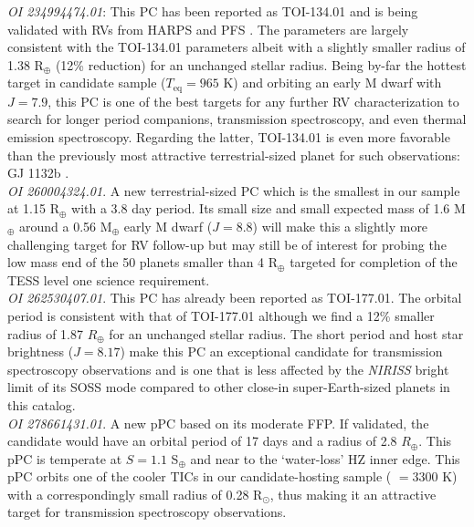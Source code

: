 \emph{OI 234994474.01}: This PC has been reported as TOI-134.01 and is being validated with RVs
from HARPS and PFS \citep{astudillodefru19}. The \pipeline{} parameters are largely consistent with the TOI-134.01
parameters albeit with a slightly smaller radius of 1.38 R$_{\oplus}$ (12\% reduction) for
an unchanged stellar radius. Being by-far the hottest target in candidate sample ($T_{\text{eq}}=965$ K)
and orbiting an early M dwarf with $J=7.9$, this PC is one of the best targets for any further RV
characterization to search for longer period companions, transmission spectroscopy, and even thermal
emission spectroscopy. Regarding the latter, TOI-134.01
is even more favorable than the previously most attractive
terrestrial-sized planet for such observations: GJ 1132b \citep{morley17}. \\

\emph{OI 260004324.01}. A new terrestrial-sized PC which is the smallest in our sample
at 1.15 R$_{\oplus}$ with a 3.8 day period. Its small size and small expected mass of 1.6 M$_{\oplus}$
around a 0.56 M$_{\oplus}$ early M dwarf ($J=8.8$) will make this a slightly more challenging target
for RV follow-up but may still be of interest for probing the low mass end of the 50 planets
smaller than 4 R$_{\oplus}$ targeted for completion of the TESS level one science requirement. \\

\emph{OI 262530407.01}. This PC has already been reported as TOI-177.01. The \pipeline{} orbital
period is consistent with that of TOI-177.01 although we find a 12\% smaller radius of 1.87
$R_{\oplus}$ for an unchanged stellar radius. The short period and host star brightness ($J=8.17$)
make this PC an exceptional candidate for transmission spectroscopy observations and is one
that is less affected by the \emph{NIRISS} bright limit of its SOSS mode compared to other
close-in super-Earth-sized planets in this catalog. \\

\emph{OI 278661431.01}. A new pPC based on its moderate FFP. If validated, the candidate
would have an orbital period of 17 days and a radius of 2.8 $R_{\oplus}$. This pPC is temperate
at $S=1.1$ S$_{\oplus}$ and near to the `water-loss' HZ inner edge. This pPC orbits one of the
cooler TICs in our candidate-hosting sample (\teff{} $=3300$ K) with a correspondingly small
radius of 0.28 R$_{\odot}$, thus making it an attractive target for transmission spectroscopy
observations. \\

